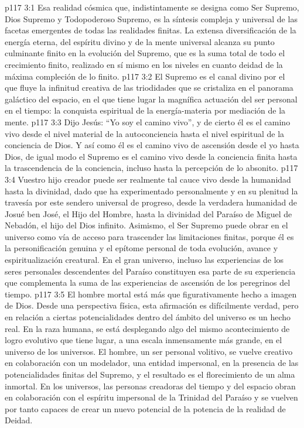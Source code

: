 \vs p117 3:1 Esa realidad cósmica que, indistintamente se designa como Ser Supremo, Dios Supremo y Todopoderoso Supremo, es la síntesis compleja y universal de las facetas emergentes de todas las realidades finitas. La extensa diversificación de la energía eterna, del espíritu divino y de la mente universal alcanza su punto culminante finito en la evolución del Supremo, que es la suma total de todo el crecimiento finito, realizado en sí mismo en los niveles en cuanto deidad de la máxima compleción de lo finito.
\vs p117 3:2 El Supremo es el canal divino por el que fluye la infinitud creativa de las triodidades que se cristaliza en el panorama galáctico del espacio, en el que tiene lugar la magnífica actuación del ser personal en el tiempo: la conquista espiritual de la energía\hyp{}materia por mediación de la mente.
\vs p117 3:3 \pc Dijo Jesús: “Yo soy el camino vivo”, y de cierto él es el camino vivo desde el nivel material de la autoconciencia hasta el nivel espiritual de la conciencia de Dios. Y así como él es el camino vivo de ascensión desde el yo hasta Dios, de igual modo el Supremo es el camino vivo desde la conciencia finita hasta la trascendencia de la conciencia, incluso hasta la percepción de lo absonito.
\vs p117 3:4 Vuestro hijo creador puede ser realmente tal cauce vivo desde la humanidad hasta la divinidad, dado que ha experimentado personalmente y en su plenitud la travesía por este sendero universal de progreso, desde la verdadera humanidad de Josué ben José, el Hijo del Hombre, hasta la divinidad del Paraíso de Miguel de Nebadón, el hijo del Dios infinito. Asimismo, el Ser Supremo puede obrar en el universo como vía de acceso para trascender las limitaciones finitas, porque él es la personificación genuina y el epítome personal de toda evolución, avance y espiritualización creatural. En el gran universo, incluso las experiencias de los seres personales descendentes del Paraíso constituyen esa parte de su experiencia que complementa la suma de las experiencias de ascensión de los peregrinos del tiempo.
\vs p117 3:5 \pc El hombre mortal está más que figurativamente hecho a imagen de Dios. Desde una perspectiva física, esta afirmación es difícilmente verdad, pero en relación a ciertas potencialidades dentro del ámbito del universo es un hecho real. En la raza humana, se está desplegando algo del mismo acontecimiento de logro evolutivo que tiene lugar, a una escala inmensamente más grande, en el universo de los universos. El hombre, un ser personal volitivo, se vuelve creativo en colaboración con un modelador, una entidad impersonal, en la presencia de las potencialidades finitas del Supremo, y el resultado es el florecimiento de un alma inmortal. En los universos, las personas creadoras del tiempo y del espacio obran en colaboración con el espíritu impersonal de la Trinidad del Paraíso y se vuelven por tanto capaces de crear un nuevo potencial de la potencia de la realidad de Deidad.
